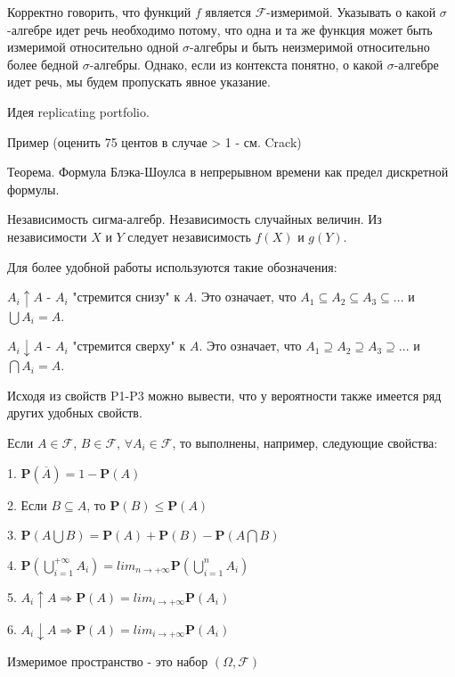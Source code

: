{Корректно говорить, что функций $f$ является
$\mathcal{F}$-измеримой. Указывать о какой $\sigma$-алгебре идет
речь необходимо потому, что одна и та же функция может быть
измеримой относительно одной $\sigma$-алгебры и быть неизмеримой
относительно более бедной $\sigma$-алгебры. Однако, если из
контекста понятно, о какой $\sigma$-алгебре идет речь, мы будем
пропускать явное указание.



Идея replicating portfolio. \par
Пример (оценить 75 центов в случае > 1 - см. Crack)


Теорема. Формула Блэка-Шоулса в непрерывном времени как предел дискретной формулы. \par




Независимость сигма-алгебр. Независимость случайных величин. Из
независимости $X$ и $Y$ следует независимость $f(X)$ и $g(Y)$.


Для более удобной работы используются такие обозначения:


$A_{i}\uparrow A$ - $A_{i}$ "стремится снизу" к $A$. Это означает,
что $A_{1} \subseteq A_{2} \subseteq A_{3} \subseteq ...$ и
$\bigcup A_{i}=A$.

$A_{i}\downarrow A$ - $A_{i}$ "стремится сверху" к $A$. Это
означает, что $A_{1} \supseteq A_{2} \supseteq A_{3} \supseteq
...$ и $\bigcap A_{i}=A$.


Исходя из свойств P1-P3 можно вывести, что у вероятности также
имеется ряд других удобных свойств.

Если $A\in\mathcal{F}$, $B\in\mathcal{F}$, $\forall
A_{i}\in\mathcal{F}$, то выполнены, например, следующие свойства:

1. $\mathbf{P}(\overline{A})=1-\mathbf{P}(A)$

2. Если $B\subseteq A$, то $\mathbf{P}(B)\leq \mathbf{P}(A)$

3. $\mathbf{P}(A\bigcup
B)=\mathbf{P}(A)+\mathbf{P}(B)-\mathbf{P}(A\bigcap B)$

4. $\mathbf{P}(\bigcup_{i=1}^{+\infty} A_{i})=lim_{n\rightarrow
+\infty} \mathbf{P}(\bigcup_{i=1}^{n} A_{i})$

5. $A_{i} \uparrow A \Rightarrow \mathbf{P}(A)=lim_{i\rightarrow
+\infty} \mathbf{P}(A_{i})$

6. $A_{i} \downarrow A \Rightarrow \mathbf{P}(A)=lim_{i\rightarrow
+\infty} \mathbf{P}(A_{i})$


\begin{mydef}
Измеримое пространство - это набор
$(\Omega,\mathcal{F})$
\end{mydef}

}
